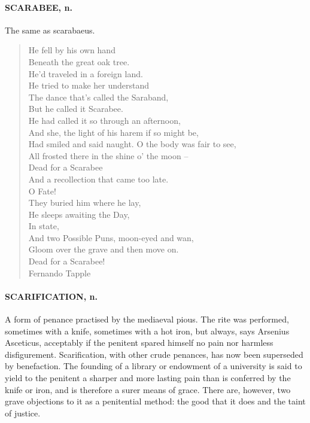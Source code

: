 \documentclass[11pt]{article}
\begin{document}
\paragraph{SCARABEE, n.}  The same as scarabaeus.

\begin{quote}               He fell by his own hand \\
                  Beneath the great oak tree. \\
              He'd traveled in a foreign land. \\
              He tried to make her understand \\
              The dance that's called the Saraband, \\
                  But he called it Scarabee. \\
  He had called it so through an afternoon, \\
      And she, the light of his harem if so might be, \\
      Had smiled and said naught.  O the body was fair to see, \\
  All frosted there in the shine o' the moon -- \\
                      Dead for a Scarabee \\
  And a recollection that came too late. \\
                          O Fate! \\
                  They buried him where he lay, \\
                  He sleeps awaiting the Day, \\
                          In state, \\
  And two Possible Puns, moon-eyed and wan, \\
  Gloom over the grave and then move on. \\
                      Dead for a Scarabee! \\
                                                     Fernando Tapple  \end{quote}

\paragraph{SCARIFICATION, n.}  A form of penance practised by the mediaeval pious.
The rite was performed, sometimes with a knife, sometimes with a hot
iron, but always, says Arsenius Asceticus, acceptably if the penitent
spared himself no pain nor harmless disfigurement.  Scarification,
with other crude penances, has now been superseded by benefaction.
The founding of a library or endowment of a university is said to
yield to the penitent a sharper and more lasting pain than is
conferred by the knife or iron, and is therefore a surer means of
grace.  There are, however, two grave objections to it as a
penitential method:  the good that it does and the taint of justice.
\end{document}

